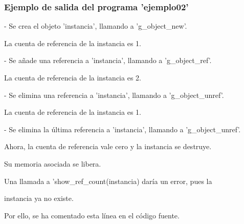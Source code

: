 \subsubsection{Ejemplo de salida del programa 'ejemplo02'}
\textsf{- Se crea el objeto 'instancia', llamando a 'g\_object\_new'.}\par
\textsf{  La cuenta de referencia de la instancia es 1.}
\par\textsf{ }\par
\textsf{- Se añade una referencia a 'instancia', llamando a 'g\_object\_ref'.}\par
\textsf{  La cuenta de referencia de la instancia es 2.}\par
\par\textsf{ }\par
\textsf{- Se elimina una referencia a 'instancia', llamando a 'g\_object\_unref'.}\par
\textsf{  La cuenta de referencia de la instancia es 1.}\par
\par\textsf{ }\par
\textsf{- Se elimina la última referencia a 'instancia', llamando a 'g\_object\_unref'.}\par
\textsf{  Ahora, la cuenta de referencia vale cero y la instancia se destruye.}\par
\textsf{  Su memoria asociada se libera.}\par
\textsf{  Una llamada a 'show\_ref\_count(instancia) daría un error, pues la}\par
\textsf{  instancia ya no existe.}\par
\textsf{  Por ello, se ha comentado esta línea en el código fuente.}\par

